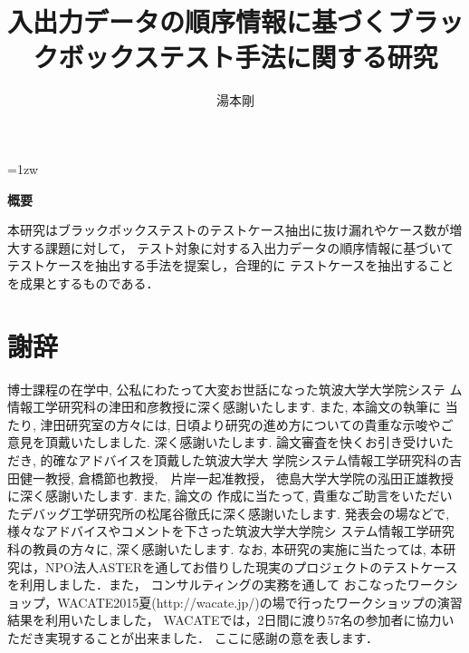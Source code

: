\documentclass[a4paper,12pt]{jreport}
\title{入出力データの順序情報に基づくブラックボックステスト手法に関する研究}
\author{湯本剛}
\begin{document}
\maketitle
\thispagestyle{empty}
\newpage

\thispagestyle{empty}
\vspace*{20pt plus 1fil}
\parindent=1zw
\noindent
\begin{center}
{\bf 概要}
\vspace{5mm}
\end{center}
本研究はブラックボックステストのテストケース抽出に抜け漏れやケース数が増大する課題に対して，
テスト対象に対する入出力データの順序情報に基づいてテストケースを抽出する手法を提案し，合理的に
テストケースを抽出することを成果とするものである．


\par
\vspace{0pt plus 1fil}
\newpage

\tableofcontents
\listoffigures
\listoftables

\pagebreak \setcounter{page}{1}






%


\chapter*{謝辞}
博士課程の在学中, 公私にわたって大変お世話になった筑波大学大学院システ
ム情報工学研究科の津田和彦教授に深く感謝いたします. また, 本論文の執筆に
当たり, 津田研究室の方々には, 日頃より研究の進め方についての貴重な示唆やご
意見を頂戴いたしました. 深く感謝いたします.
論文審査を快くお引き受けいただき, 的確なアドバイスを頂戴した筑波大学大
学院システム情報工学研究科の吉田健一教授, 倉橋節也教授,　片岸一起准教授， 徳島大学大学院の泓田正雄教授に深く感謝いたします. また, 論文の
作成に当たって, 貴重なご助言をいただいたデバッグ工学研究所の松尾谷徹氏に深く感謝いたします.
発表会の場などで, 様々なアドバイスやコメントを下さった筑波大学大学院シ
ステム情報工学研究科の教員の方々に, 深く感謝いたします.
なお, 本研究の実施に当たっては,
本研究は，NPO法人ASTERを通してお借りした現実のプロジェクトのテストケースを利用しました．また，
コンサルティングの実務を通して
おこなったワークショップ，WACATE2015夏(http://wacate.jp/)の場で行ったワークショップの演習結果を利用いたしました，
WACATEでは，2日間に渡り57名の参加者に協力いただき実現することが出来ました．
ここに感謝の意を表します．
\end{document}
